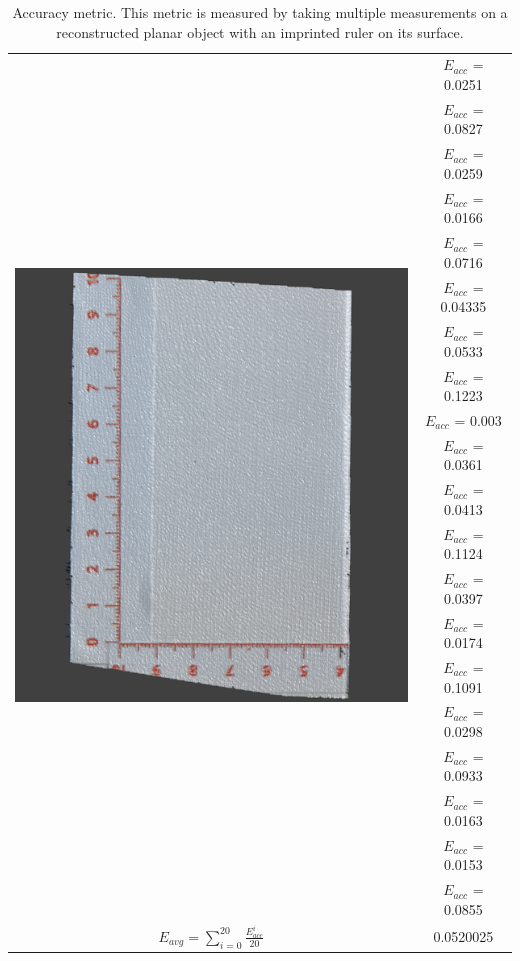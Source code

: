 \documentclass[final,12pt,3p]{elsarticle}
\begin{document}
\begin{table}[!ht]
\centering
\begin{tabular}{| c | c |}
   \hline
   \multirow{20}{*}{\includegraphics[scale=0.3]{./render_ruler.png}} &    $E_{acc}$ = 0.0251\\
&$E_{acc}$ = 0.0827\\
&$E_{acc}$ = 0.0259\\
&$E_{acc}$ = 0.0166\\
&$E_{acc}$ = 0.0716\\
&$E_{acc}$ = 0.04335\\
&$E_{acc}$ = 0.0533\\
&$E_{acc}$ = 0.1223\\
&$E_{acc}$ = 0.003\\
&$E_{acc}$ = 0.0361\\
&$E_{acc}$ = 0.0413\\
&$E_{acc}$ = 0.1124\\
&$E_{acc}$ = 0.0397\\
&$E_{acc}$ = 0.0174\\
&$E_{acc}$ = 0.1091\\
&$E_{acc}$ = 0.0298\\
&$E_{acc}$ = 0.0933\\
&$E_{acc}$ = 0.0163\\
&$E_{acc}$ = 0.0153\\
&$E_{acc}$ = 0.0855\\
   \hline
   $E_{avg} = \sum\limits_{i=0}^{20} \frac{E_{acc}^{i}}{20}$ & 0.0520025\\
   \hline
\end{tabular}
  \caption{\label{tab:metric3} Accuracy metric. This metric is measured by taking multiple measurements on a reconstructed planar object with an imprinted ruler on its surface.}
  \end{table}
\end{document}
